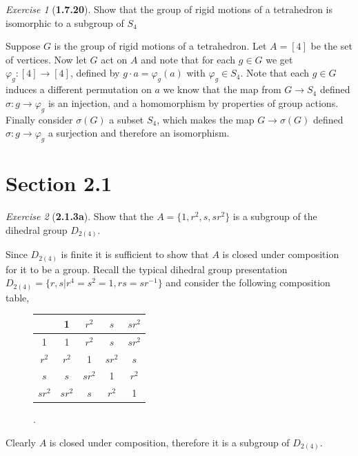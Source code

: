 \documentclass[12pt]{amsart}
\makeatletter
\theoremstyle{remark}
\newtheorem*{exercise}{Exercise}%
\renewenvironment{proof}[1][\proofname]{\par\doublespacing
  \pushQED{\qed}%
  \normalfont \topsep6\p@\@plus6\p@\relax
  \list{}{%
    \settowidth{\leftmargin}{\itshape\proofname:\hskip\labelsep}%
    \setlength{\labelwidth}{0pt}%
    \setlength{\itemindent}{-\leftmargin}%
  }%
  \item[\hskip\labelsep\itshape#1\@addpunct{:}]\ignorespaces
}{%
  \popQED\endlist\@endpefalse
  \singlespacing
}
\theoremstyle{mycomment}
\makeatother
\begin{document}
\begin{exercise}[\textbf{1.7.20}] Show that the group of rigid motions of a tetrahedron is isomorphic to a subgroup of $S_4$
  \begin{proof} Suppose $G$ is the group of rigid motions of a tetrahedron. Let $A=[4]$ be the set of vertices. Now let $G$ act on $A$ and note that for each 
    $g \in G$ we get $\varphi_g: [4] \to [4]$, defined by $g \cdot a = \varphi_g(a)$ with $\varphi_g \in S_4$.
    Note that each $g \in G$ induces a different permutation on $a$ we know that the map from $G \to S_4$ defined $\sigma: g \to \varphi_g$ is an injection, and a homomorphism by properties of group actions. 
    Finally consider $\sigma(G)$ a subset $S_4$, which makes the map $G \to \sigma(G)$ defined $\sigma: g \to \varphi_g$ a surjection and therefore an isomorphism. 
    \end{proof}
\end{exercise}
\vspace{.15in}


\section*{\textbf{Section 2.1}}

\begin{exercise}[\textbf{2.1.3a}] Show that the $A = \{1, r^2, s, sr^2\}$ is a subgroup of the dihedral group $D_{2(4)}$.
    \begin{proof}[Solution] Since $D_{2(4)}$ is finite it is sufficient to show that $A$ is closed under composition for it to be a group. Recall the typical dihedral group presentation
      $D_{2(4)} = \{r, s|r^4 = s^2 = 1, rs = sr^{-1}\}$ and consider the following composition table, 
      
      \begin{figure}[H]
        \begin{tabular}{ c || c | c | c | c } 
          & 1 & $r^2$ & $s$ & $sr^2$\\
          \hline
          \hline
          1 & 1 & $r^2$ & $s$ & $sr^2$\\
          \hline
          $r^2$ & $r^2$ & 1 & $sr^2$ & $s$\\
          \hline
          $s$ & $s$ & $sr^2$ & 1 & $r^2$\\
          \hline
          $sr^2$ & $sr^2$ & $s$ & $r^2$& 1
        \end{tabular}.
      \end{figure}
      Clearly $A$ is closed under composition, therefore it is a subgroup of $D_{2(4)}$. 
    \end{proof}
\end{exercise}
\vspace{.15in}
\end{document}
